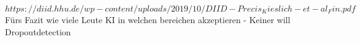 $https://diid.hhu.de/wp-content/uploads/2019/10/DIID-Precis_Kieslich-et-al_Fin.pdf $
\\ Fürs Fazit wie viele Leute KI in welchen bereichen akzeptieren - Keiner will Dropoutdetection